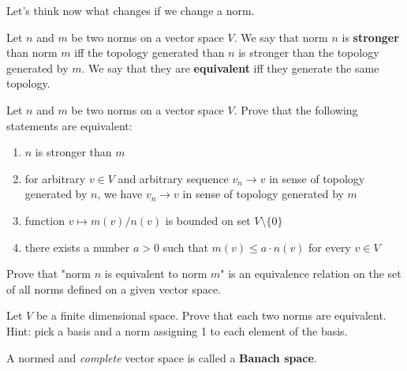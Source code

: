 Let's think now what changes if we change a norm.

\begin{definition}
  Let $n$ and $m$ be two norms on a vector space $V$. We say that norm $n$ is \textbf{stronger} than norm $m$ iff the topology generated than $n$ is stronger than the
  topology generated by $m$. We say that they are \textbf{equivalent} iff they generate the same topology.
\end{definition}

\begin{exercise}
  Let $n$ and $m$ be two norms on a vector space $V$. Prove that the following statements are equivalent:
  \begin{enumerate}
    \item $n$ is stronger than $m$
    \item for arbitrary $v\in V$ and arbitrary sequence $v_n\to v$ in sense of topology generated by $n$, we have $v_n\to v$ in sense of topology generated by $m$
    \item function $v\mapsto m(v)/n(v)$ is bounded on set $V\setminus\{0\}$
    \item there exists a number $a>0$ such that $m(v)\le a\cdot n(v)$ for every $v\in V$
  \end{enumerate}
\end{exercise}

\begin{exercise}
  Prove that "norm $n$ is equivalent to norm $m$" is an equivalence relation on the set of all norms defined on a given vector space. 
\end{exercise}

\begin{exercise}
  Let $V$ be a finite dimensional space. Prove that each two norms are equivalent. Hint: pick a basis and a norm assigning 1 to each element of the basis.
\end{exercise}

\begin{definition}
  A normed and \emph{complete} vector space is called a \textbf{Banach space}.
\end{definition}
